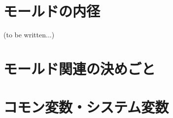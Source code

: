 \chapter{モールドの内径}
%
(to be written...)



\begin{appendices}
\Apart




\chapter{モールド関連の決めごと}





\chapter{コモン変数・システム変数}






\end{appendices}
